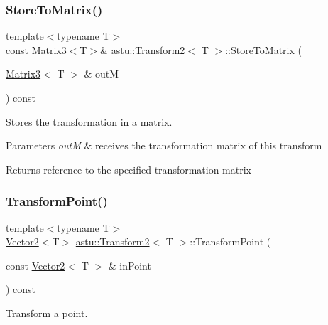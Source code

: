 \subsubsection{\texorpdfstring{Store\+To\+Matrix()}{StoreToMatrix()}}
{\footnotesize\ttfamily template$<$typename T$>$ \\
const \hyperlink{classastu_1_1Matrix3}{Matrix3}$<$T$>$\& \hyperlink{classastu_1_1Transform2}{astu\+::\+Transform2}$<$ T $>$\+::Store\+To\+Matrix (\begin{DoxyParamCaption}\item[{\hyperlink{classastu_1_1Matrix3}{Matrix3}$<$ T $>$ \&}]{outM }\end{DoxyParamCaption}) const\hspace{0.3cm}{\ttfamily [inline]}}

Stores the transformation in a matrix.


\begin{DoxyParams}{Parameters}
{\em outM} & receives the transformation matrix of this transform \\
\hline
\end{DoxyParams}
\begin{DoxyReturn}{Returns}
reference to the specified transformation matrix 
\end{DoxyReturn}
\mbox{\label{classastu_1_1Transform2_a1ba0bffb65372e61791f24c1d2edb60a}} 
\subsubsection{\texorpdfstring{Transform\+Point()}{TransformPoint()}\hspace{0.1cm}{\footnotesize\ttfamily [1/2]}}
{\footnotesize\ttfamily template$<$typename T$>$ \\
\hyperlink{classastu_1_1Vector2}{Vector2}$<$T$>$ \hyperlink{classastu_1_1Transform2}{astu\+::\+Transform2}$<$ T $>$\+::Transform\+Point (\begin{DoxyParamCaption}\item[{const \hyperlink{classastu_1_1Vector2}{Vector2}$<$ T $>$ \&}]{in\+Point }\end{DoxyParamCaption}) const\hspace{0.3cm}{\ttfamily [inline]}}

Transform a point.


